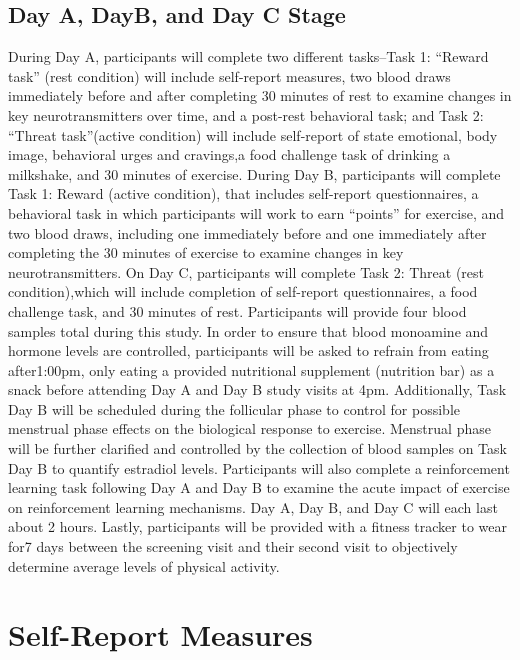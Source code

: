\documentclass[
]{book}
\begin{document}
\hypertarget{day-a-dayb-and-day-c-stage}{%
\section{Day A, DayB, and Day C Stage}\label{day-a-dayb-and-day-c-stage}}

During Day A, participants will complete two different tasks--Task 1: ``Reward task'' (rest condition) will include self-report measures, two blood draws immediately before and after completing 30 minutes of rest to examine changes in key neurotransmitters over time, and a post-rest behavioral task; and Task 2: ``Threat task''(active condition) will include self-report of state emotional, body image, behavioral urges and cravings,a food challenge task of drinking a milkshake, and 30 minutes of exercise. During Day B, participants will complete Task 1: Reward (active condition), that includes self-report questionnaires, a behavioral task in which participants will work to earn ``points'' for exercise, and two blood draws, including one immediately before and one immediately after completing the 30 minutes of exercise to examine changes in key neurotransmitters. On Day C, participants will complete Task 2: Threat (rest condition),which will include completion of self-report questionnaires, a food challenge task, and 30 minutes of rest. Participants will provide four blood samples total during this study. In order to ensure that blood monoamine and hormone levels are controlled, participants will be asked to refrain from eating after1:00pm, only eating a provided nutritional supplement (nutrition bar) as a snack before attending Day A and Day B study visits at 4pm. Additionally, Task Day B will be scheduled during the follicular phase to control for possible menstrual phase effects on the biological response to exercise. Menstrual phase will be further clarified and controlled by the collection of blood samples on Task Day B to quantify estradiol levels. Participants will also complete a reinforcement learning task following Day A and Day B to examine the acute impact of exercise on reinforcement learning mechanisms. Day A, Day B, and Day C will each last about 2 hours. Lastly, participants will be provided with a fitness tracker to wear for7 days between the screening visit and their second visit to objectively determine average levels of physical activity.

\hypertarget{self-report-measures}{%
\chapter{Self-Report Measures}\label{self-report-measures}}
\end{document}
